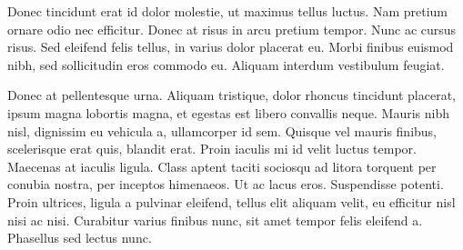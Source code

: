 Donec tincidunt erat id dolor molestie, ut maximus tellus luctus. Nam pretium ornare odio nec efficitur. Donec at risus in arcu pretium tempor. Nunc ac cursus risus. Sed eleifend felis tellus, in varius dolor placerat eu. Morbi finibus euismod nibh, sed sollicitudin eros commodo eu. Aliquam interdum vestibulum feugiat.

Donec at pellentesque urna. Aliquam tristique, dolor rhoncus tincidunt placerat, ipsum magna lobortis magna, et egestas est libero convallis neque. Mauris nibh nisl, dignissim eu vehicula a, ullamcorper id sem. Quisque vel mauris finibus, scelerisque erat quis, blandit erat. Proin iaculis mi id velit luctus tempor. Maecenas at iaculis ligula. Class aptent taciti sociosqu ad litora torquent per conubia nostra, per inceptos himenaeos. Ut ac lacus eros. Suspendisse potenti. Proin ultrices, ligula a pulvinar eleifend, tellus elit aliquam velit, eu efficitur nisl nisi ac nisi. Curabitur varius finibus nunc, sit amet tempor felis eleifend a. Phasellus sed lectus nunc.